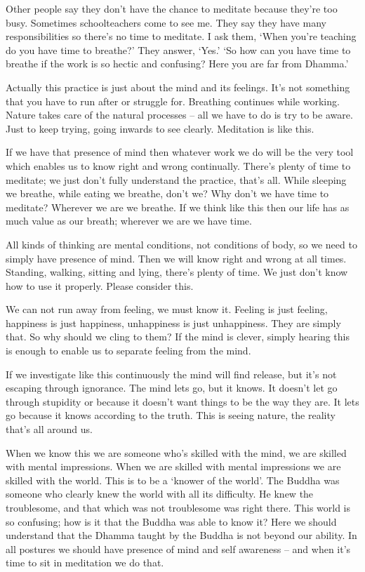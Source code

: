 Other people say they don't have the chance to meditate because they're too busy. Sometimes schoolteachers come to see me. They say they have many responsibilities so there's no time to meditate. I ask them, `When you're teaching do you have time to breathe?' They answer, `Yes.' `So how can you have time to breathe if the work is so hectic and confusing? Here you are far from Dhamma.' 

Actually this practice is just about the mind and its feelings. It's not something that you have to run after or struggle for. Breathing continues while working. Nature takes care of the natural processes -- all we have to do is try to be aware. Just to keep trying, going inwards to see clearly. Meditation is like this. 

If we have that presence of mind then whatever work we do will be the very tool which enables us to know right and wrong continually. There's plenty of time to meditate; we just don't fully understand the practice, that's all. While sleeping we breathe, while eating we breathe, don't we? Why don't we have time to meditate? Wherever we are we breathe. If we think like this then our life has as much value as our breath; wherever we are we have time.

All kinds of thinking are mental conditions, not conditions of body, so we need to simply have presence of mind. Then we will know right and wrong at all times. Standing, walking, sitting and lying, there's plenty of time. We just don't know how to use it properly. Please consider this. 

We can not run away from feeling, we must know it. Feeling is just feeling, happiness is just happiness, unhappiness is just unhappiness. They are simply that. So why should we cling to them? If the mind is clever, simply hearing this is enough to enable us to separate feeling from the mind. 

If we investigate like this continuously the mind will find release, but it's not escaping through ignorance. The mind lets go, but it knows. It doesn't let go through stupidity or because it doesn't want things to be the way they are. It lets go because it knows according to the truth. This is seeing nature, the reality that's all around us. 

When we know this we are someone who's skilled with the mind, we are skilled with mental impressions. When we are skilled with mental impressions we are skilled with the world. This is to be a `knower of the world'. The Buddha was someone who clearly knew the world with all its difficulty. He knew the troublesome, and that which was not troublesome was right there. This world is so confusing; how is it that the Buddha was able to know it? Here we should understand that the Dhamma taught by the Buddha is not beyond our ability. In all postures we should have presence of mind and self awareness -- and when it's time to sit in meditation we do that. 

